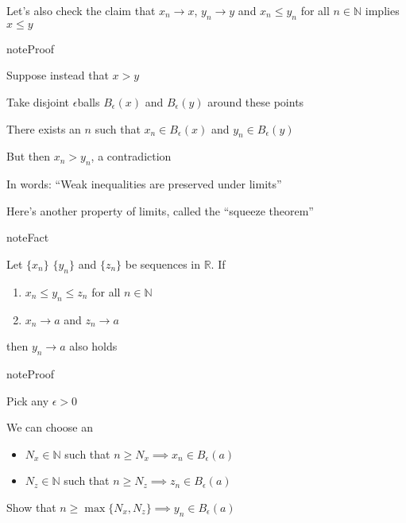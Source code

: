 \documentclass[letterpaper,10pt,english]{jupyterBook}
\begin{document}
\sphinxAtStartPar
Let’s also check the claim that \(x_n \to x\),  \(y_n \to y\)  and
\(x_n \leq y_n\) for all \(n \in \mathbb{N}\) implies \(x \leq y\)

\begin{sphinxadmonition}{note}{Proof}

\sphinxAtStartPar
Suppose instead that \(x > y\)

\sphinxAtStartPar
Take disjoint \(\epsilon\)\sphinxhyphen{}balls \(B_\epsilon(x)\) and \(B_\epsilon(y)\) around
these points

\begin{figure}[H]
\centering

\noindent{}
\end{figure}

\sphinxAtStartPar
There exists an \(n\) such that \(x_n \in B_\epsilon(x)\) and \(y_n \in B_\epsilon(y)\)

\sphinxAtStartPar
But then \(x_n > y_n\), a contradiction
\end{sphinxadmonition}

\sphinxAtStartPar
In words: “Weak inequalities are preserved under limits”

\sphinxAtStartPar
Here’s another property of limits, called the “squeeze theorem”

\begin{sphinxadmonition}{note}{Fact}

\sphinxAtStartPar
Let \(\{x_n\}\) \(\{y_n\}\) and \(\{z_n\}\) be sequences in \(\mathbb{R}\). If
\begin{enumerate}
%
\item {} 
\sphinxAtStartPar
\(x_n \leq y_n \leq z_n\) for all \(n \in \mathbb{N}\)

\item {} 
\sphinxAtStartPar
\(x_n \to a\) and \(z_n \to a\)

\end{enumerate}

\sphinxAtStartPar
then \(y_n \to a\) also holds
\end{sphinxadmonition}

\begin{sphinxadmonition}{note}{Proof}

\sphinxAtStartPar
Pick any \(\epsilon > 0\)

\sphinxAtStartPar
We can choose an
\begin{itemize}
\item {} 
\sphinxAtStartPar
\(N_x \in \mathbb{N}\) such that \(n \geq N_x \implies x_n \in B_\epsilon(a)\)

\item {} 
\sphinxAtStartPar
\(N_z \in \mathbb{N}\) such that \(n \geq N_z \implies z_n \in B_\epsilon(a)\)

\end{itemize}

\sphinxAtStartPar
{} Show that \(n \geq \max\{N_x, N_z\} \implies y_n \in B_\epsilon(a)\)
\end{sphinxadmonition}
\end{document}
